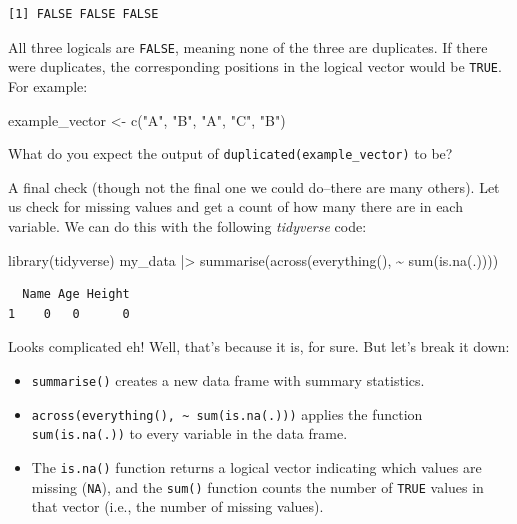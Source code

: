 \documentclass[
  letterpaper,
  8pt,
  a4paper]{book}
\newenvironment{Shaded}{\begin{snugshade}}{\end{snugshade}}
\newcommand{\FunctionTok}[1]{\textcolor[rgb]{0.28,0.35,0.67}{#1}}
\newcommand{\NormalTok}[1]{\textcolor[rgb]{0.00,0.23,0.31}{#1}}
\newcommand{\OtherTok}[1]{\textcolor[rgb]{0.00,0.23,0.31}{#1}}
\newcommand{\SpecialCharTok}[1]{\textcolor[rgb]{0.37,0.37,0.37}{#1}}
\newcommand{\StringTok}[1]{\textcolor[rgb]{0.13,0.47,0.30}{#1}}
\newcounter{none} %
\providecommand{\tightlist}{%
  \setlength{\itemsep}{0pt}\setlength{\parskip}{0pt}}
\begin{document}
\begin{Shaded}
\end{Shaded}

\begin{verbatim}
[1] FALSE FALSE FALSE
\end{verbatim}

All three logicals are \texttt{FALSE}, meaning none of the three are
duplicates. If there were duplicates, the corresponding positions in the
logical vector would be \texttt{TRUE}. For example:

\begin{Shaded}
\begin{Highlighting}[]
\NormalTok{example\_vector }\OtherTok{\textless{}{-}} \FunctionTok{c}\NormalTok{(}\StringTok{"A"}\NormalTok{, }\StringTok{"B"}\NormalTok{, }\StringTok{"A"}\NormalTok{, }\StringTok{"C"}\NormalTok{, }\StringTok{"B"}\NormalTok{)}
\end{Highlighting}
\end{Shaded}

What do you expect the output of \texttt{duplicated(example\_vector)} to
be?

A final check (though not the final one we could do--there are many
others). Let us check for missing values and get a count of how many
there are in each variable. We can do this with the following
\emph{tidyverse} code:

\begin{Shaded}
\begin{Highlighting}[]
\FunctionTok{library}\NormalTok{(tidyverse)}
\NormalTok{my\_data }\SpecialCharTok{|\textgreater{}} 
  \FunctionTok{summarise}\NormalTok{(}\FunctionTok{across}\NormalTok{(}\FunctionTok{everything}\NormalTok{(), }\SpecialCharTok{\textasciitilde{}} \FunctionTok{sum}\NormalTok{(}\FunctionTok{is.na}\NormalTok{(.))))}
\end{Highlighting}
\end{Shaded}

\begin{verbatim}
  Name Age Height
1    0   0      0
\end{verbatim}

Looks complicated eh! Well, that's because it is, for sure. But let's
break it down:

\begin{itemize}
\tightlist
\item
  \texttt{summarise()} creates a new data frame with summary statistics.
\item
  \texttt{across(everything(),\ \textasciitilde{}\ sum(is.na(.)))}
  applies the function \texttt{sum(is.na(.))} to every variable in the
  data frame.
\item
  The \texttt{is.na()} function returns a logical vector indicating
  which values are missing (\texttt{NA}), and the \texttt{sum()}
  function counts the number of \texttt{TRUE} values in that vector
  (i.e., the number of missing values).
\end{itemize}
\end{document}
